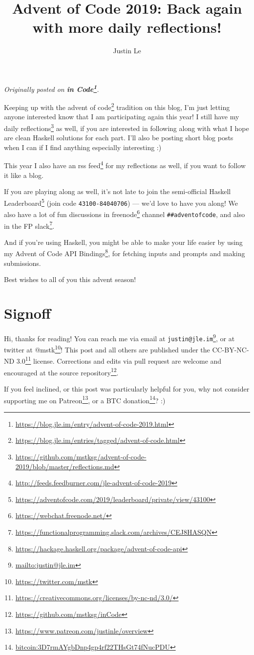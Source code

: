 \documentclass[]{article}
\title{Advent of Code 2019: Back again with more daily reflections!}
\author{Justin Le}
\renewcommand{\href}[2]{#2\footnote{\url{#1}}}
\begin{document}
\maketitle

\emph{Originally posted on
\textbf{\href{https://blog.jle.im/entry/advent-of-code-2019.html}{in Code}}.}

Keeping up with the
\href{https://blog.jle.im/entries/tagged/advent-of-code.html}{advent of code}
tradition on this blog, I'm just letting anyone interested know that I am
participating again this year! I still have my
\href{https://github.com/mstksg/advent-of-code-2019/blob/master/reflections.md}{daily
reflections} as well, if you are interested in following along with what I hope
are clean Haskell solutions for each part. I'll also be posting short blog posts
when I can if I find anything especially interesting :)

This year I also have an
\href{http://feeds.feedburner.com/jle-advent-of-code-2019}{rss feed} for my
reflections as well, if you want to follow it like a blog.

If you are playing along as well, it's not late to join the semi-official
\href{https://adventofcode.com/2019/leaderboard/private/view/43100}{Haskell
Leaderboard} (join code \texttt{43100-84040706}) --- we'd love to have you
along! We also have a lot of fun discussions in
\href{https://webchat.freenode.net/}{freenode} channel
\texttt{\#\#adventofcode}, and also in the
\href{https://functionalprogramming.slack.com/archives/CEJ8HASQN}{FP slack}.

And if you're using Haskell, you might be able to make your life easier by using
my \href{https://hackage.haskell.org/package/advent-of-code-api}{Advent of Code
API Bindings}, for fetching inputs and prompts and making submissions.

Best wishes to all of you this advent season!

\hypertarget{signoff}{%
\section{Signoff}\label{signoff}}

Hi, thanks for reading! You can reach me via email at
\href{mailto:justin@jle.im}{\nolinkurl{justin@jle.im}}, or at twitter at
\href{https://twitter.com/mstk}{@mstk}! This post and all others are published
under the \href{https://creativecommons.org/licenses/by-nc-nd/3.0/}{CC-BY-NC-ND
3.0} license. Corrections and edits via pull request are welcome and encouraged
at \href{https://github.com/mstksg/inCode}{the source repository}.

If you feel inclined, or this post was particularly helpful for you, why not
consider \href{https://www.patreon.com/justinle/overview}{supporting me on
Patreon}, or a \href{bitcoin:3D7rmAYgbDnp4gp4rf22THsGt74fNucPDU}{BTC donation}?
:)
\end{document}
